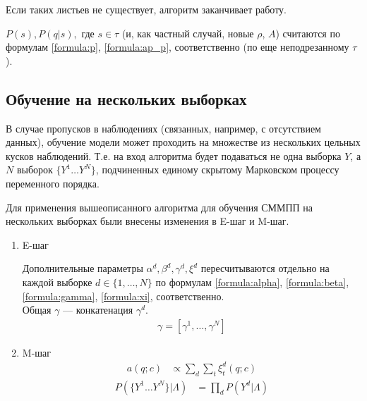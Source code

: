 \documentclass{matmex-diploma-custom}
\begin{document}
Если таких листьев не существует, алгоритм заканчивает работу.

$P(s), P(q|s), \text{ где } s \in \tau$ (и, как частный случай, новые $\rho$, $ A $) считаются по формулам \ref{formula:p}, \ref{formula:ap_p}, соответственно (по еще неподрезанному $\tau$).

\subsection{Обучение на нескольких выборках}
В случае пропусков в наблюдениях (связанных, например, с отсутствием данных), обучение модели может проходить на множестве из нескольких цельных кусков наблюдений.
Т.е. на вход алгоритма будет подаваться не одна выборка $Y$, а                                                                                                                                                                                                                                                                                                                                                                                                                                                                                                                                                                                                                                                              $ N $ выборок $ \{Y^{1} \ldots Y^{N}\}$, подчиненных единому скрытому Марковском процессу переменного порядка.

Для применения вышеописанного алгоритма для обучения СММПП на нескольких выборках были внесены изменения в E-шаг и M-шаг.
\\
\begin{enumerate}
\item E-шаг

Дополнительные параметры $\alpha^{d}, \beta^{d}, \gamma^{d}, \xi^{d}$ пересчитываются отдельно на каждой выборке $d \in \{1, \ldots, N\}$ по формулам
\ref{formula:alpha}, \ref{formula:beta}, \ref{formula:gamma}, \ref{formula:xi}, соответственно.
\\
Общая $\gamma$ --- конкатенация $\gamma^{d}$.
\begin{align}
\gamma = [\gamma^{1}, \ldots ,\gamma^{N}] 
\end{align}
\item M-шаг
\begin{align}
a(q; c) &\propto \sum_{d}{\sum_{t}{\xi^{d}_{t}(q;c)}} 
\end{align}
\begin{align}
P(\{Y^{1} \ldots Y^{N}\}|\Lambda) &= \prod_{d}{P(Y^{d}|\Lambda)}
\end{align}

\end{enumerate}
\end{document}
